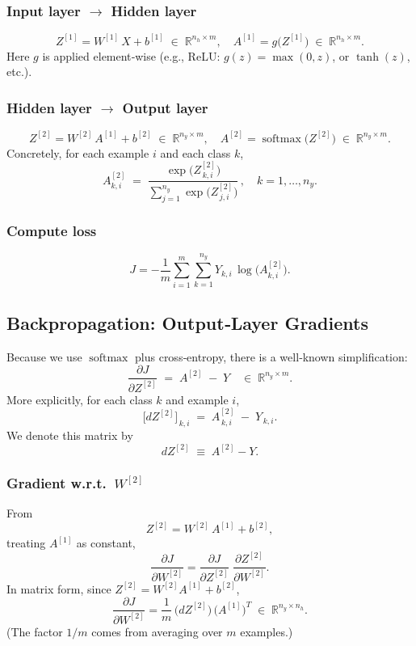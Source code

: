 \documentclass{article}
\begin{document}
\subsubsection{Input layer \(\to\) Hidden layer}
\[
  Z^{[1]} = W^{[1]}\,X + b^{[1]} \;\in\; \mathbb{R}^{n_h \times m}, 
  \quad
  A^{[1]} = g\bigl(Z^{[1]}\bigr) \;\in\; \mathbb{R}^{n_h \times m}.
\]
Here $g$ is applied element‐wise (e.g., ReLU: $g(z) = \max(0,z)$, or $\tanh(z)$, etc.).

\subsubsection{Hidden layer \(\to\) Output layer}
\[
  Z^{[2]} = W^{[2]}\,A^{[1]} + b^{[2]} \;\in\; \mathbb{R}^{n_y \times m}, 
  \quad
  A^{[2]} = \operatorname{softmax}\bigl(Z^{[2]}\bigr) \;\in\; \mathbb{R}^{n_y \times m}.
\]
Concretely, for each example $i$ and each class $k$,
\[
  A^{[2]}_{k,i}
    \;=\; \frac{\exp\!\bigl(Z^{[2]}_{\,k,i}\bigr)}
              {\displaystyle \sum_{j=1}^{n_y} \exp\!\bigl(Z^{[2]}_{\,j,i}\bigr)}\,,
  \quad k = 1,\dots,n_y.
\]

\subsubsection{Compute loss}
\[
  J = -\frac{1}{m} \sum_{i=1}^m \sum_{k=1}^{n_y} 
        Y_{k,i}\,\log\!\bigl(A^{[2]}_{k,i}\bigr).
\]

\bigskip
\subsection{Backpropagation: Output‐Layer Gradients}

Because we use $\operatorname{softmax}$ plus cross‐entropy, there is a well‐known simplification:
\begin{equation}\label{eq:dZ2}
  \frac{\partial J}{\partial Z^{[2]}}
  \;=\; A^{[2]} \;-\; Y 
  \quad\in \; \mathbb{R}^{n_y \times m}.
\end{equation}
More explicitly, for each class $k$ and example $i$,
\[
  \bigl[dZ^{[2]}\bigr]_{\,k,i}
    \;=\; A^{[2]}_{\,k,i} \;-\; Y_{\,k,i}.
\]
We denote this matrix by
\[
  dZ^{[2]} \;\equiv\; A^{[2]} - Y.
\]

\subsubsection{Gradient w.r.t.\ \(W^{[2]}\)}

From
\[
  Z^{[2]} = W^{[2]}\,A^{[1]} + b^{[2]},
\]
treating $A^{[1]}$ as constant,
\[
  \frac{\partial J}{\partial W^{[2]}}
    = \frac{\partial J}{\partial Z^{[2]}}
      \;\frac{\partial Z^{[2]}}{\partial W^{[2]}}.
\]
In matrix form, since $Z^{[2]} = W^{[2]} A^{[1]} + b^{[2]}$,  
\begin{equation}\label{eq:dW2}
  \frac{\partial J}{\partial W^{[2]}}
    = \frac{1}{m}\,\bigl(dZ^{[2]}\bigr)\,\bigl(A^{[1]}\bigr)^{T}
    \;\in\; \mathbb{R}^{n_y \times n_h}.
\end{equation}
(The factor $1/m$ comes from averaging over $m$ examples.)
\end{document}
